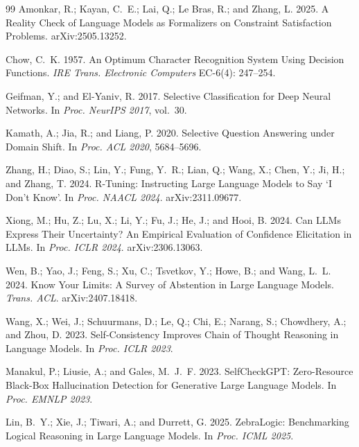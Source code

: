 \documentclass[letterpaper]{article}
\begin{document}
\begin{thebibliography}{99}
Amonkar, R.; Kayan, C.~E.; Lai, Q.; Le Bras, R.; and Zhang, L. 2025.
A Reality Check of Language Models as Formalizers on Constraint Satisfaction Problems.
arXiv:2505.13252.

Chow, C.~K. 1957.
An Optimum Character Recognition System Using Decision Functions.
\textit{IRE Trans. Electronic Computers} EC-6(4): 247--254.

Geifman, Y.; and El-Yaniv, R. 2017.
Selective Classification for Deep Neural Networks.
In \textit{Proc. NeurIPS 2017}, vol.~30.

Kamath, A.; Jia, R.; and Liang, P. 2020.
Selective Question Answering under Domain Shift.
In \textit{Proc. ACL 2020}, 5684--5696.

Zhang, H.; Diao, S.; Lin, Y.; Fung, Y.~R.; Lian, Q.; Wang, X.; Chen, Y.;
Ji, H.; and Zhang, T. 2024.
R-Tuning: Instructing Large Language Models to Say `I Don't Know'.
In \textit{Proc. NAACL 2024}. arXiv:2311.09677.

Xiong, M.; Hu, Z.; Lu, X.; Li, Y.; Fu, J.; He, J.; and Hooi, B. 2024.
Can LLMs Express Their Uncertainty? An Empirical Evaluation of Confidence
Elicitation in LLMs. In \textit{Proc. ICLR 2024}. arXiv:2306.13063.

Wen, B.; Yao, J.; Feng, S.; Xu, C.; Tsvetkov, Y.; Howe, B.; and
Wang, L.~L. 2024.
Know Your Limits: A Survey of Abstention in Large Language Models.
\textit{Trans. ACL}. arXiv:2407.18418.

Wang, X.; Wei, J.; Schuurmans, D.; Le, Q.; Chi, E.; Narang, S.;
Chowdhery, A.; and Zhou, D. 2023.
Self-Consistency Improves Chain of Thought Reasoning in Language Models.
In \textit{Proc. ICLR 2023}.

Manakul, P.; Liusie, A.; and Gales, M.~J.~F. 2023.
SelfCheckGPT: Zero-Resource Black-Box Hallucination Detection for
Generative Large Language Models. In \textit{Proc. EMNLP 2023}.

Lin, B.~Y.; Xie, J.; Tiwari, A.; and Durrett, G. 2025.
ZebraLogic: Benchmarking Logical Reasoning in Large Language Models.
In \textit{Proc. ICML 2025}.


\end{thebibliography}
\end{document}
